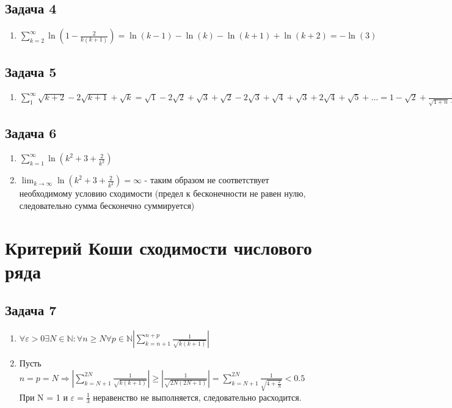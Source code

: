 \documentclass[a4paper,12pt]{article}
\begin{document}
\subsection{Задача 4}
\begin{enumerate}
	\item $\sum_{k=2}^{\infty} \ln(1 - \frac{2}{k(k+1)}) = \ln(k-1) - \ln(k) - \ln(k+1)  + \ln(k+2) = -\ln(3)$ 
\end{enumerate}

\subsection{Задача 5}
\begin{enumerate}
	\item $\sum_{1}^{\infty} \sqrt{k+2}-2\sqrt{k+1}+\sqrt{k} = \sqrt{1}-2\sqrt{2}+\sqrt{3}+\sqrt{2}-2\sqrt{3} + \sqrt{4} + \sqrt{3} + 2\sqrt{4} + \sqrt{5} + \dots = 1 - \sqrt{2} + \frac{1}{\sqrt{1+n}-\sqrt{2+n}} = 1-\sqrt{2}$
\end{enumerate}

\subsection{Задача 6}
\begin{enumerate}
	\item $\sum_{k=1}^{\infty} \ln(k^2+3+\frac{2}{k^2})$
	\item $\lim_{k \to \infty} \ln(k^2+3+\frac{2}{k^2}) = \infty$ - таким образом не соответствует необходимому условию сходимости (предел к бесконечности не равен нулю, следовательно сумма бесконечно суммируется)
\end{enumerate}

\section{Критерий Коши сходимости числового ряда}

\subsection{Задача 7}
\begin{enumerate}
	\item $\forall \varepsilon > 0 \exists N \in \mathbb{N}: \forall n \ge N \forall p \in \mathbb{N} |\sum_{k=n+1}^{n+p} \frac{1}{\sqrt{k(k+1)}}|$
	\item Пусть $n  = p = N \Rightarrow |\sum_{k=N+1}^{2N}\frac{1}{\sqrt{k(k+1)}}| \ge |\frac{1}{\sqrt{2N(2N+1)}}| = \sum_{k=N+1}^{2N} \frac{1}{\sqrt{4+\frac{2}{N}}} < 0.5$ При N = 1 и $\varepsilon = \frac{1}{3}$ неравенство не выполняется, следовательно расходится. 
\end{enumerate}
\end{document}
